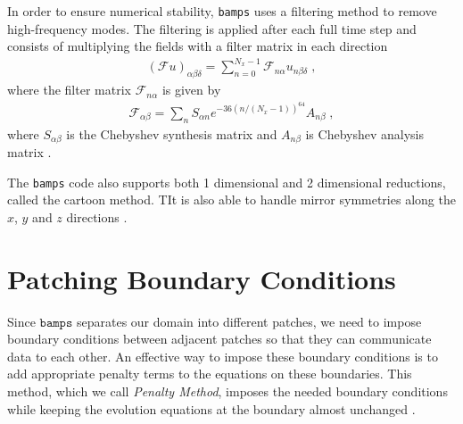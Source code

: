 In order to ensure numerical stability, \texttt{bamps} uses a filtering method to remove high-frequency modes. The filtering is applied after each full time step and consists of multiplying the fields with a filter matrix in each direction
%
\begin{align}
    (\mathcal{F}u)_{\alpha \beta \delta} = \sum_{n=0}^{N_x -1} \mathcal{F}_{n \alpha} u_{n \beta \delta} \; ,
\end{align}
%
where the filter matrix $\mathcal{F}_{n \alpha}$ is given by
%
\begin{align}
    \mathcal{F}_{\alpha \beta} = \sum_n S_{\alpha n} e^{-36 (n/(N_x - 1))^{64}} A_{n \beta} \; ,
\end{align}
%
where $S_{\alpha \beta}$ is the Chebyshev synthesis matrix and $A_{n \beta}$ is Chebyshev analysis matrix \cite{Pseudospectral_method_for_gravitational_wave_collapse,Numerical_Relativity_Solving_Einsteins_Equations_on_the_Computer}.

The \texttt{bamps} code also supports both 1 dimensional and 2 dimensional reductions, called the cartoon method. TIt is also able to handle mirror symmetries along the $x$, $y$ and $z$ directions \cite{The_evolution_of_hyperboloidal_data_with_the_dual_foliation_formalism_Mathematical_analysis_and_wave_equation_tests}.

\section{Patching Boundary Conditions}
\label{section:Patch_Boundaries}

Since $\texttt{bamps}$ separates our domain into different patches, we need to impose boundary conditions between adjacent patches so that they can communicate data to each other. An effective way to impose these boundary conditions is to add appropriate penalty terms to the equations on these boundaries. This method, which we call \textit{Penalty Method}, imposes the needed boundary conditions while keeping the evolution equations at the boundary almost unchanged \cite{Pseudospectral_method_for_gravitational_wave_collapse,Spectral_methods_for_the_wave_equation_in_second-order_form}.

